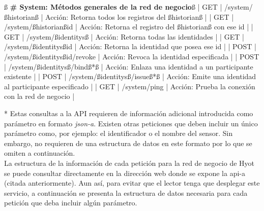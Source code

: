\documentclass[12pt,a4paper, twoside]{report}
\begin{document}
\begin{listing}[style=consola, basicstyle=\ttfamily\scriptsize, numbers=none, escapechar=ß]
ß\textbf{{\color{maroon} \# System: Métodos generales de la red de negocio}}ß
| GET    | /system/ß\gls{historian}ß               | Acción: Retorna todos los registros del ß\Gls{historian}ß          |
| GET    | /system/ß\gls{historian}ß{id}           | Acción: Retorna el registro del ß\Gls{historian}ß con ese id       |
| GET    | /system/ß\glspl{identity}ß              | Acción: Retorna todas las identidades                     |
| GET    | /system/ß\glspl{identity}ß{id}          | Acción: Retorna la identidad que posea ese id             |
| POST   | /system/ß\glspl{identity}ß{id}/revoke   | Acción: Revoca la identidad especificada                  |
| POST   | /system/ß\glspl{identity}ß/bindß{\color{red}*}ß        | Acción: Enlaza una identidad a un participante existente  |
| POST   | /system/ß\glspl{identity}ß/issueß{\color{red}*}ß       | Acción: Emite una identidad al participante especificado  |
| GET    | /system/ping                   | Acción: Prueba la conexión con la red de negocio          |

\end{listing}	

{\color{red}*} Estas consultas a la API requieren de información adicional introducida como parámetro en formato \textit{\gls{json-a}}. Existen otras peticiones que deben incluir un único parámetro como, por ejemplo: el identificador o el nombre del sensor. Sin embargo, no requieren de una estructura de datos en este formato por lo que se omiten a continuación. \\

La estructura de la información de cada petición para la red de negocio de Hyot se puede consultar directamente en la dirección web donde se expone la \gls{api-a} (citada anteriormente). Aun así, para evitar que el lector tenga que desplegar este servicio, a continuación se presenta la estructura de datos necesaria para cada petición que deba incluir algún parámetro. \\
\end{document}
